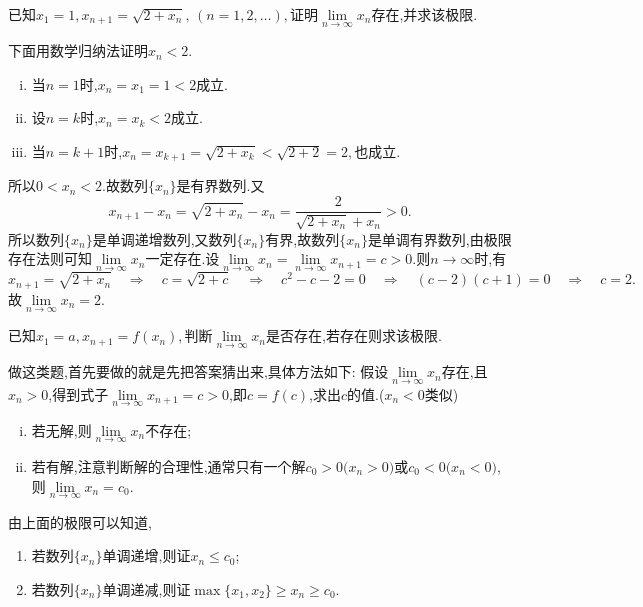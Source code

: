 \examples 已知$x_1=1,x_{n+1}=\sqrt{2+x_n},\,(n=1,2,\ldots),$证明$\lim\limits_{n \to \infty }x_n$存在,并求该极限.

\solve 下面用数学归纳法证明$x_n<2$.
\begin{enumerate}[(i)]
	\item 当$n=1$时,$x_n=x_1=1<2$成立.
	\item 设$n=k$时,$x_n=x_k<2$成立.
	\item 当$n=k+1$时,$x_n=x_{k+1}=\sqrt{2+x_k}<\sqrt{2+2}=2,$也成立.
\end{enumerate}
所以$0<x_n<2.$故数列$\{x_n\}$是有界数列.又
\[
x_{n+1}-x_n=\sqrt{2+x_n}-x_n=\frac{2}{\sqrt{2+x_n}+x_n}>0.
\]
所以数列$\{x_n\}$是单调递增数列,又数列$\{x_n\}$有界,故数列$\{x_n\}$是单调有界数列,由极限存在法则可知$\lim\limits_{n \to \infty}x_n$一定存在.设$\lim\limits_{n \to \infty}x_n=\lim\limits_{n \to \infty}x_{n+1}=c>0.$则$n \to \infty$时,有
\[
x_{n+1}=\sqrt{2+x_n} \quad \Rightarrow \quad c=\sqrt{2+c} \quad \Rightarrow \quad c^2-c-2=0 \quad \Rightarrow \quad (c-2)(c+1)=0 \quad \Rightarrow \quad c=2.
\]
故$\lim\limits_{n \to \infty}x_n=2.$

\inference[求递归数列的极限]
\vspace*{1em} \noindent  \hspace*{0.2em}  \hspace{1.5em}
已知$x_1=a,x_{n+1}=f(x_n),$判断$\lim\limits_{n \to \infty }x_n$是否存在,若存在则求该极限.\jg\jg

\noindent {}

做这类题,首先要做的就是先把答案猜出来,具体方法如下:
假设$\lim\limits_{n \to \infty}x_n$存在,且$x_n>0$,得到式子$\lim\limits_{n \to \infty}x_{n+1}=c>0$,即$c=f(c)$,求出$c$的值.($x_n<0$类似)
\begin{enumerate}[(i)]
	\item 若无解,则$\lim\limits_{n \to \infty}x_n$不存在;
	\item 若有解,注意判断解的合理性,通常只有一个解$c_0>0\big(x_n>0\big)$或$c_0<0\big(x_n<0\big)$,则$\lim\limits_{n \to \infty}x_n=c_0$.
\end{enumerate}
\jg

\noindent {}

由上面的极限可以知道,
\begin{enumerate}[]
	\item 若数列$\{x_n\}$单调递增,则证$x_n \le c_0$;
	\item 若数列$\{x_n\}$单调递减,则证$\max \{x_1,x_2\} \ge x_n \ge c_0$.
\end{enumerate}
\sj
{}
\jg

